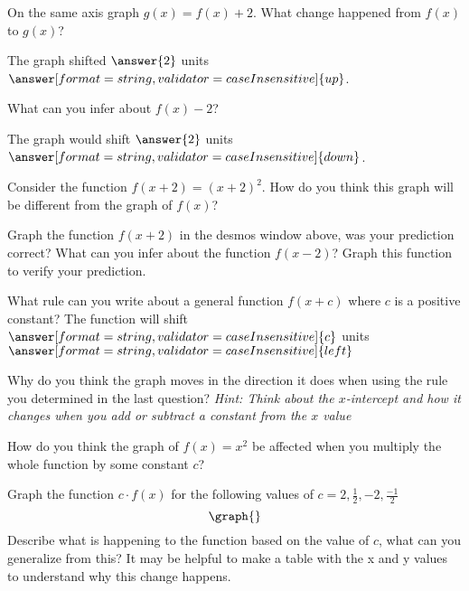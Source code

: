 \documentclass{ximera}
\begin{document}
\begin{question}

On the same axis graph $g(x)=f(x)+2$. What change happened from $f(x)$ to $g(x)$?

The graph shifted $\answer{2}$ units $\answer[format=string,validator=caseInsensitive]{up}$.

What can you infer about $f(x)-2$?

The graph would shift $\answer{2}$ units $\answer[format=string,validator=caseInsensitive]{down}$.

Consider the function $f(x+2)=(x+2)^2$. How do you think this graph will be different from the graph of $f(x)$?
\begin{freeResponse}
\end{freeResponse}
Graph the function $f(x+2)$ in the desmos window above, was your prediction correct? What can you infer about the function $f(x-2)$? Graph this function to verify your prediction.
\begin{freeResponse}
\end{freeResponse}
What rule can you write about a general function $f(x+c)$ where $c$ is a positive constant?
The function will shift $\answer[format=string,validator=caseInsensitive]{c}$ units $\answer[format=string,validator=caseInsensitive]{left}$

Why do you think the graph moves in the direction it does when using the rule you determined in the last question? \textit{Hint: Think about the $x$-intercept and how it changes when you add or subtract a constant from the $x$ value}
\begin{freeResponse}
\end{freeResponse}
How do you think the graph of $f(x)=x^2$ be affected when you multiply the whole function by some constant $c$?
\begin{freeResponse}
\end{freeResponse}
Graph the function $c \cdot f(x)$ for the following values of $c=2,\frac{1}{2},-2,\frac{-1}{2}$
\[
\graph{}
\]
Describe what is happening to the function based on the value of $c$, what can you generalize from this? It may be helpful to make a table with the x and y values to understand why this change happens.
\begin{freeResponse}
\end{freeResponse}
\end{question}
\end{document}
